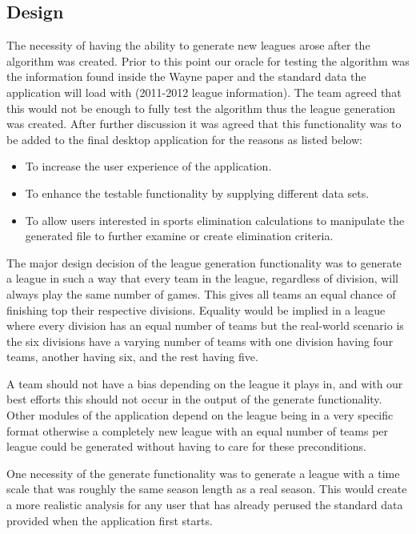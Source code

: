 \subsection{Design}
The necessity of having the ability to generate new leagues arose
after the algorithm was created. Prior to this point our oracle for
testing the algorithm was the information found inside the Wayne paper
\cite{Wayne} and the standard data the application will load with
(2011-2012 league information). The team agreed that this would not be 
enough to fully test the algorithm thus the league generation was
created. After further discussion it was agreed that this
functionality was to be added to the final desktop application for the
reasons as listed below:

\begin{itemize}
\item To increase the user experience of the application.
\item To enhance the testable functionality by supplying different data
sets.
\item To allow users interested in sports elimination calculations to
manipulate the generated file to further examine or create
elimination criteria.
\end{itemize}

The major design decision of the league generation functionality was to
generate a league in such a way that every team in the league,
regardless of division, will always play the same number of games. This
gives all teams an equal chance of finishing top their respective
divisions. Equality would be implied in a league where every division has
an equal number of teams but the real-world scenario is the six divisions
have a varying number of teams with one division having four teams, another
having six, and the rest having five.


A team should not have a bias depending on the league it
plays in, and with our best efforts this should not occur in the
output of the generate functionality. Other
modules of the application depend on the league being in a very
specific format otherwise a completely new league with an equal number
of teams per league could be generated without having to care for
these preconditions. 

One necessity of the generate functionality was to generate a league
with a time scale that was roughly the same season length as a real
season. This would create a more realistic analysis for any user that
has already perused the standard data provided when the application
first starts.

